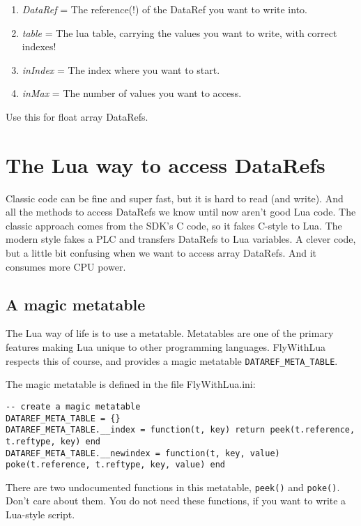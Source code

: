 \documentclass[11pt,parskip=half,a4paper]{scrartcl}
\begin{document}
\begin{enumerate}
	\item \emph{DataRef} = The reference(!) of the DataRef you want to write into.
	\item \emph{table} = The lua table, carrying the values you want to write, with correct indexes!
	\item \emph{inIndex} = The index where you want to start.
	\item \emph{inMax} = The number of values you want to access.
\end{enumerate}

Use this for float array DataRefs.


\section{The Lua way to access DataRefs}

Classic code can be fine and super fast, but it is hard to read (and write). And all the methods to access DataRefs we know until now aren't good Lua code. The classic approach comes from the SDK's C code, so it fakes C-style to Lua. The modern style fakes a PLC and transfers DataRefs to Lua variables. A clever code, but a little bit confusing when we want to access array DataRefs. And it consumes more CPU power.

\subsection{A magic metatable}

The Lua way of life is to use a metatable. Metatables are one of the primary features making Lua unique to other programming languages. FlyWithLua respects this of course, and provides a magic metatable \verb|DATAREF_META_TABLE|.

The magic metatable is defined in the file FlyWithLua.ini:

\begin{lstlisting}[firstnumber=42]
-- create a magic metatable
DATAREF_META_TABLE = {}
DATAREF_META_TABLE.__index = function(t, key) return peek(t.reference, t.reftype, key) end
DATAREF_META_TABLE.__newindex = function(t, key, value) poke(t.reference, t.reftype, key, value) end
\end{lstlisting}

There are two undocumented functions in this metatable, \verb|peek()| and \verb|poke()|. Don't care about them. You do not need these functions, if you want to write a Lua-style script.
\end{document}
